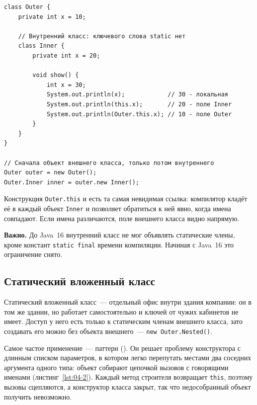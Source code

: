 \begin{listing}[H]
\begin{verbatim}
class Outer {
    private int x = 10;

    // Внутренний класс: ключевого слова static нет
    class Inner {
        private int x = 20;

        void show() {
            int x = 30;
            System.out.println(x);            // 30 - локальная
            System.out.println(this.x);       // 20 - поле Inner
            System.out.println(Outer.this.x); // 10 - поле Outer
        }
    }
}

// Сначала объект внешнего класса, только потом внутреннего
Outer outer = new Outer();
Outer.Inner inner = outer.new Inner();
\end{verbatim}
\caption{Внутренний класс и разрешение имён}
\label{lst:04-1}
\end{listing}

Конструкция \texttt{Outer.this} и есть та самая невидимая ссылка: компилятор
кладёт её в каждый объект \texttt{Inner} и позволяет обратиться к ней явно,
когда имена совпадают. Если имена различаются, поле внешнего класса видно
напрямую.

\begin{vrezka}
\textbf{Важно.} До Java~16 внутренний класс не мог объявлять статические члены,
кроме констант \texttt{static final} времени компиляции. Начиная с Java~16 это
ограничение снято.
\end{vrezka}

\subsection{Статический вложенный класс}

Статический вложенный класс~--- отдельный офис внутри здания компании: он в том
же здании, но работает самостоятельно и ключей от чужих кабинетов не имеет.
Доступ у него есть только к статическим членам внешнего класса, зато создавать
его можно без объекта внешнего~--- \texttt{new Outer.Nested()}.

Самое частое применение~--- паттерн  (). Он решает
проблему конструктора с длинным списком параметров, в котором легко перепутать
местами два соседних аргумента одного типа: объект собирают цепочкой вызовов с
говорящими именами (листинг~\ref{lst:04-2}). Каждый метод строителя возвращает
\texttt{this}, поэтому вызовы сцепляются, а конструктор класса закрыт, так что
недособранный объект получить невозможно.

